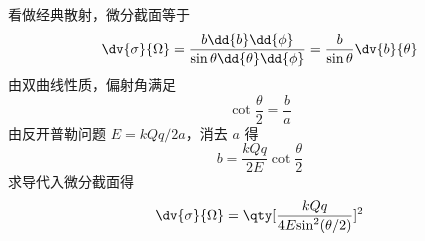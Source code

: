 
看做经典散射，微分截面等于
\begin{equation}
\dv{\sigma}{\Omega} = \frac{{b \dd{b}\dd{\phi} }}{{\sin \theta \dd{\theta} \dd{\phi} }} = \frac{b}{{\sin \theta }}\dv{b}{\theta}
\end{equation}
由双曲线性质，偏射角满足
\begin{equation}
\cot{\frac{\theta }{2}}= \frac{b}{a}
\end{equation}
由反开普勒问题  $E = {{kQq}}/{{2a}}$，消去 $a$ 得
\begin{equation}
b = \frac{{kQq}}{{2E}}\cot {\frac{\theta }{2}}
\end{equation}
求导代入微分截面得
\begin{equation}
\dv{\sigma}{\Omega} = \qty[ {\frac{{kQq}}{{4E{{\sin }^2}(\theta /2)}}} ]^2
\end{equation}
